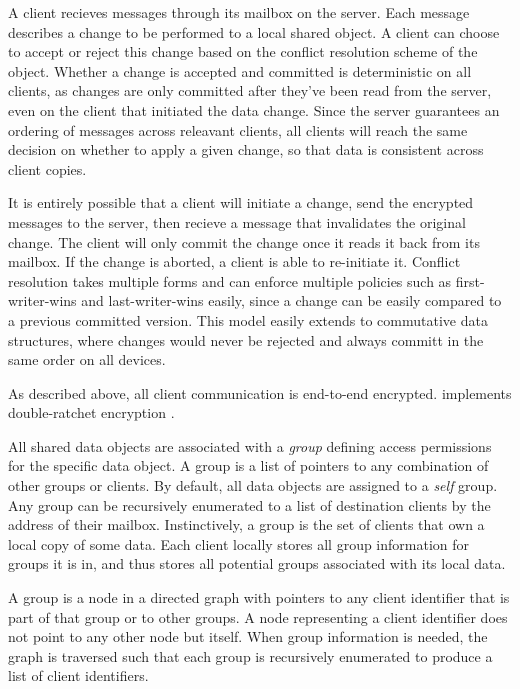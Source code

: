 A client recieves messages through its mailbox on the server. Each message 
describes a change to be performed to a local shared object. A client can choose 
to accept or reject this change based on the conflict resolution scheme of the 
object. Whether a change is accepted and committed is deterministic on all 
clients, as changes are only committed after they've been read from the server, 
even on the client that initiated the data change. Since the server guarantees 
an ordering of messages across releavant clients, all clients will reach the 
same decision on whether to apply a given change, so that data is consistent 
across client copies. 

It is entirely possible that a client will initiate a change, send the encrypted 
messages to the server, then recieve a message that invalidates the original 
change. The client will only commit the change once it reads it back from its 
mailbox. If the change is aborted, a client is able to re-initiate it. Conflict 
resolution takes multiple forms and \name{} can enforce multiple policies such 
as first-writer-wins and last-writer-wins easily, since a change can be easily 
compared to a previous committed version. This model easily extends to 
commutative data structures, where changes would never be rejected and always 
committ in the same order on all devices.

As described above, all client communication is end-to-end encrypted. \name{} 
implements double-ratchet encryption \tocite{}. 
 

All shared data objects are associated with a \textit{group} defining access 
permissions for the specific data object. A group is a list of pointers to any 
combination of other groups or clients. By default, all \name{} data objects are 
assigned to a \textit{self} group. Any group can be recursively enumerated to a 
list of destination clients by the address of their mailbox. Instinctively, a group is the set of clients that own a local copy of some data.
Each client locally stores all group information for groups it is in, and thus 
stores all potential groups associated with its local data. 

A group is a node in a directed graph with pointers to any client identifier that 
is part of that group or to other groups. A node representing a client identifier 
does not point to any other node but itself. When group information is needed, 
the graph is traversed such that each group is recursively enumerated to produce 
a list of client identifiers. 

